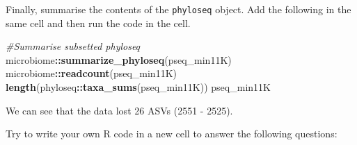 \documentclass[
]{book}
\newenvironment{Shaded}{\begin{snugshade}}{\end{snugshade}}
\newcommand{\CommentTok}[1]{\textcolor[rgb]{0.56,0.35,0.01}{\textit{#1}}}
\newcommand{\FunctionTok}[1]{\textcolor[rgb]{0.13,0.29,0.53}{\textbf{#1}}}
\newcommand{\NormalTok}[1]{#1}
\newcommand{\SpecialCharTok}[1]{\textcolor[rgb]{0.81,0.36,0.00}{\textbf{#1}}}
\begin{document}
Finally, summarise the contents of the \texttt{phyloseq} object.
Add the following in the same cell and then run the code in the cell.

\begin{Shaded}
\begin{Highlighting}[]
\CommentTok{\#Summarise subsetted phyloseq}
\NormalTok{microbiome}\SpecialCharTok{::}\FunctionTok{summarize\_phyloseq}\NormalTok{(pseq\_min11K)}
\NormalTok{microbiome}\SpecialCharTok{::}\FunctionTok{readcount}\NormalTok{(pseq\_min11K)}
\FunctionTok{length}\NormalTok{(phyloseq}\SpecialCharTok{::}\FunctionTok{taxa\_sums}\NormalTok{(pseq\_min11K))}
\NormalTok{pseq\_min11K}
\end{Highlighting}
\end{Shaded}

We can see that the data lost 26 ASVs (2551 - 2525).

Try to write your own R code in a new cell to answer the following questions:
\end{document}
